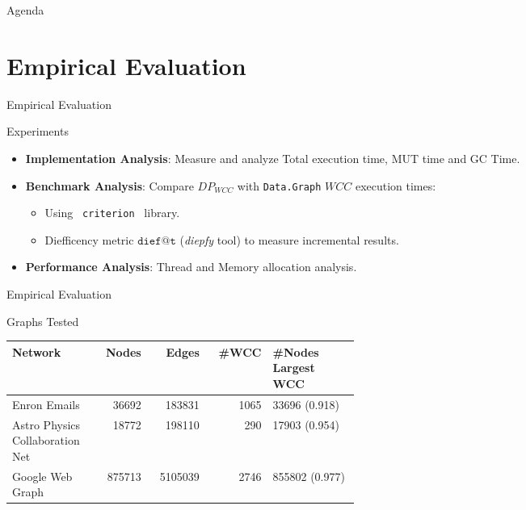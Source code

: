 \documentclass{beamer}
\begin{document}
  \begin{frame}{Agenda}
    \section{Empirical Evaluation}
    \tableofcontents[currentsection]
  \end{frame}


  \begin{frame}[fragile]{Empirical Evaluation}
    \begin{block}{Experiments}
      \begin{itemize}
        \item \textbf{Implementation Analysis}: Measure and analyze Total execution time, MUT time and GC Time.
        \item \textbf{Benchmark Analysis}: Compare $DP_{WCC}$ with \texttt{Data.Graph} $WCC$ execution times:
        \begin{itemize}
          \item Using \texttt{ criterion } library.
          \item Diefficency metric $\mathtt{dief@t}$ (\textit{diepfy} tool) to measure incremental results.
        \end{itemize}
        \item \textbf{Performance Analysis}: Thread and Memory allocation analysis.
      \end{itemize}
    \end{block}
  \end{frame}

  \begin{frame}[fragile]{Empirical Evaluation}
    \begin{block}{Graphs Tested}
    \begin{table}[H]
      \centering
      \begin{tabular}{|p{0.25\linewidth}|r|r|r|p{0.25\linewidth}|}
       \hline
       \textbf{Network} & \textbf{Nodes} & \textbf{Edges} & \textbf{\#WCC} & \textbf{\#Nodes Largest WCC} \\
       \hline
       Enron Emails & 36692 & 183831 & 1065 & 33696 (0.918) \\
       \hline
       Astro Physics Collaboration Net & 18772 & 198110 & 290 & 17903 (0.954)\\
       \hline
       Google Web Graph & 875713 & 5105039 & 2746 & 855802 (0.977)\\
       \hline
      \end{tabular}
     \end{table}
    \end{block}
  \end{frame}
\end{document}
